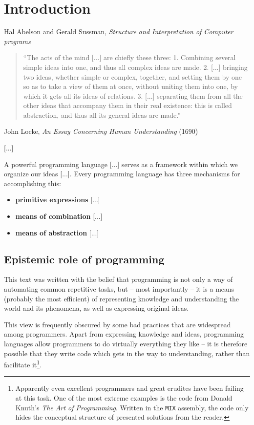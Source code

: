 \chapter{Introduction}

\begin{chapquote}{Hal Abelson and Gerald Sussman, 
\textit{Structure and Interpretation of Computer programs}}
\begin{quotation}
  ``The acts of the mind [...] are chiefly these three:
  1. Combining several simple ideas into one, and thus all complex
  ideas are made.
  2. [...] bringing two ideas, whether simple or complex, together,
  and setting them by one so as to take a view of them at once,
  without uniting them into one, by which it gets all its ideas
  of relations.
  3. [...] separating them from all the other ideas that accompany
  them in their real existence: this is called abstraction, and thus
  all its general ideas are made.''
\end{quotation}

  John Locke, \textit{An Essay Concerning Human Understanding} (1690)

  [...]

  A powerful programming language [...] serves as a framework within 
  which we organize our ideas [...]. Every programming language has
  three mechanisms for accomplishing this:
  \begin{itemize}
  \item \textbf{primitive expressions} [...]
  \item \textbf{means of combination} [...]
  \item \textbf{means of abstraction} [...]
  \end{itemize}

\end{chapquote}

\section{Epistemic role of programming}

This text was written with the belief that programming
is not only a way of automating common repetitive tasks,
but -- most importantly -- it is a means (probably the most
efficient) of representing knowledge and understanding
the world and its phenomena, as well as expressing original
ideas.

This view is frequently obscured by some bad practices
that are widespread among programmers. Apart from expressing
knowledge and ideas, programming languages allow programmers
to do virtually everything they like -- it is therefore
possible that they write code which gets in the way to
understanding, rather than facilitate it\footnote{Apparently
even excellent programmers and great erudites have been failing 
at this task. One of the most extreme examples is the code from 
Donald Knuth's \textit{The Art of Programming}.
Written in the \texttt{MIX} assembly, the code only hides the
conceptual structure of presented solutions from the reader.}.

